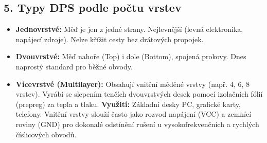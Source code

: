 \documentclass[a4paper,10pt]{article}
\begin{document}
\begin{vysvetlenibox}
\subsection*{5. Typy DPS podle počtu vrstev}

\begin{itemize}
    \item \textbf{Jednovrstvé:} Měď je jen z jedné strany. Nejlevnější (levná elektronika, napájecí zdroje). Nelze křížit cesty bez drátových propojek.
    \item \textbf{Dvouvrstvé:} Měď nahoře (Top) i dole (Bottom), spojená prokovy. Dnes naprostý standard pro běžné obvody.
    \item \textbf{Vícevrstvé (Multilayer):} Obsahují vnitřní měděné vrstvy (např. 4, 6, 8 vrstev). Vyrábí se slepením tenčích dvouvrstvých desek pomocí izolačních fólií (prepreg) za tepla a tlaku. \textbf{Využití:} Základní desky PC, grafické karty, telefony. Vnitřní vrstvy slouží často jako rozvod napájení (VCC) a zemnící roviny (GND) pro dokonalé odstínění rušení u vysokofrekvenčních a rychlých číslicových obvodů.
\end{itemize}

\end{vysvetlenibox}
\end{document}
